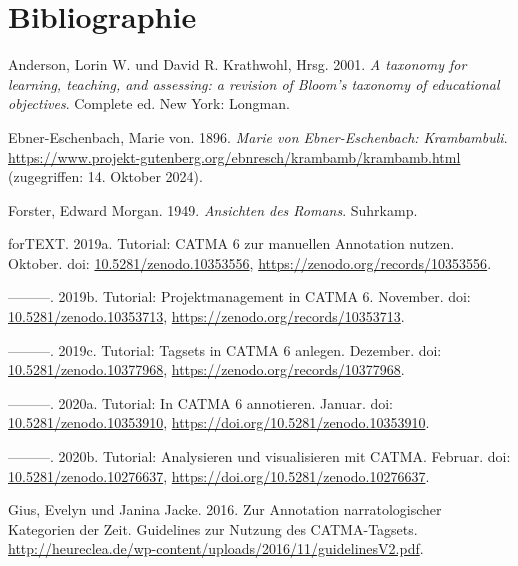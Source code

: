 \documentclass[
          a4paper,
        ]{article}
\newlength{\cslhangindent}
\newenvironment{CSLReferences}[2] %
 {\begin{list}{}{%
  \setlength{\itemindent}{0pt}
  \setlength{\leftmargin}{0pt}
  \setlength{\parsep}{0pt}
  \ifodd #1
   \setlength{\leftmargin}{\cslhangindent}
   \setlength{\itemindent}{-1\cslhangindent}
  \fi
  \setlength{\itemsep}{#2\baselineskip}}}
 {\end{list}}
\begin{document}
\section*{Bibliographie}\label{bibliography}

\label{refs}
\begin{CSLReferences}{1}{0}
Anderson, Lorin W. und David R. Krathwohl, Hrsg. 2001. \emph{A taxonomy
for learning, teaching, and assessing: a revision of {Bloom}'s taxonomy
of educational objectives}. Complete ed. New York: Longman.

Ebner-Eschenbach, Marie von. 1896. \emph{Marie von {Ebner}-{Eschenbach}:
{Krambambuli}}.
\url{https://www.projekt-gutenberg.org/ebnresch/krambamb/krambamb.html}
(zugegriffen: 14. Oktober 2024).

Forster, Edward Morgan. 1949. \emph{Ansichten des Romans}. Suhrkamp.

forTEXT. 2019a. Tutorial: {CATMA} 6 zur manuellen {Annotation} nutzen.
Oktober. doi:
\href{https://doi.org/10.5281/zenodo.10353556}{10.5281/zenodo.10353556},
\url{https://zenodo.org/records/10353556}.

---------. 2019b. Tutorial: {Projektmanagement} in {CATMA} 6. November.
doi:
\href{https://doi.org/10.5281/zenodo.10353713}{10.5281/zenodo.10353713},
\url{https://zenodo.org/records/10353713}.

---------. 2019c. Tutorial: {Tagsets} in {CATMA} 6 anlegen. Dezember.
doi:
\href{https://doi.org/10.5281/zenodo.10377968}{10.5281/zenodo.10377968},
\url{https://zenodo.org/records/10377968}.

---------. 2020a. Tutorial: {In} {CATMA} 6 annotieren. Januar. doi:
\href{https://doi.org/10.5281/zenodo.10353910}{10.5281/zenodo.10353910},
\url{https://doi.org/10.5281/zenodo.10353910}.

---------. 2020b. Tutorial: {Analysieren} und visualisieren mit {CATMA}.
Februar. doi:
\href{https://doi.org/10.5281/zenodo.10276637}{10.5281/zenodo.10276637},
\url{https://doi.org/10.5281/zenodo.10276637}.

Gius, Evelyn und Janina Jacke. 2016. Zur {Annotation} narratologischer
{Kategorien} der {Zeit}. {Guidelines} zur {Nutzung} des
{CATMA}-{Tagsets}.
\url{http://heureclea.de/wp-content/uploads/2016/11/guidelinesV2.pdf}.


\end{CSLReferences}
\end{document}
